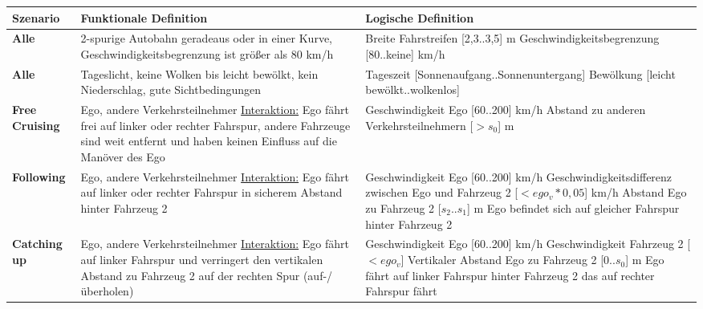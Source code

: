 \small
\begin{longtable}[c]{p{1.5cm} p{6cm} p{6cm}}
\textbf{Szenario} & \textbf{Funktionale Definition} & \textbf{Logische Definition} \\
\hline
\endhead

\textbf{Alle} & 2-spurige Autobahn geradeaus oder in einer Kurve, Geschwindigkeitsbegrenzung ist größer als 80 km/h & Breite Fahrstreifen [2,3..3,5] m \newline Geschwindigkeitsbegrenzung [80..keine] km/h \\
\hline

\textbf{Alle} & Tageslicht, keine Wolken bis leicht bewölkt, kein Niederschlag, gute Sichtbedingungen & Tageszeit [Sonnenaufgang..Sonnenuntergang] \newline Bewölkung [leicht bewölkt..wolkenlos]\\
\hline \hline

\textbf{Free Cruising} & Ego, andere Verkehrsteilnehmer \newline \underline{Interaktion:} Ego fährt frei auf linker oder rechter Fahrspur, andere Fahrzeuge sind weit entfernt und haben keinen Einfluss auf die Manöver des Ego & Geschwindigkeit Ego [60..200] km/h \newline Abstand zu anderen Verkehrsteilnehmern [$>s_0$] m \\
\hline

\textbf{Following} & Ego, andere Verkehrsteilnehmer \newline \underline{Interaktion:} Ego fährt auf linker oder rechter Fahrspur in sicherem Abstand hinter Fahrzeug 2 & Geschwindigkeit Ego [60..200] km/h \newline Geschwindigkeitsdifferenz zwischen Ego und Fahrzeug 2  [$<ego_v*0,05$] km/h \newline Abstand Ego zu Fahrzeug 2 [$s_2$..$s_1$] m \newline Ego befindet sich auf gleicher Fahrspur hinter Fahrzeug 2 \\
\hline

\textbf{Catching up} & Ego, andere Verkehrsteilnehmer \newline \underline{Interaktion:} Ego fährt auf linker Fahrspur und verringert den vertikalen Abstand zu Fahrzeug 2 auf der rechten Spur (auf-/überholen) & Geschwindigkeit Ego [60..200] km/h \newline Geschwindigkeit Fahrzeug 2 [$<ego_v$] \newline Vertikaler Abstand Ego zu Fahrzeug 2 [0..$s_0$] m \newline Ego fährt auf linker Fahrspur hinter Fahrzeug 2 das auf rechter Fahrspur fährt \\
\hline


\end{longtable}
